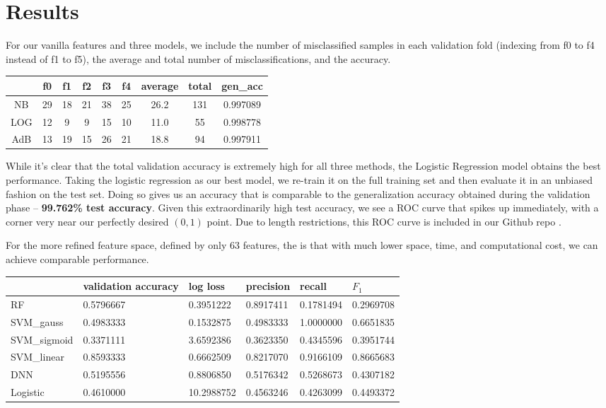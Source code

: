 \documentclass{article} %
\begin{document}
\section{Results}
For our vanilla features and three models, we include the number of misclassified samples in each validation fold (indexing from f0 to f4 instead of f1 to f5), the average and total number of misclassifications, and the accuracy.
\begin{table}[h]
\centering
\small
\begin{tabular}{|c|c|c|c|c|c|c|c|c|}
\hline
    & f0 & f1 & f2 & f3 & f4 & average & total & gen\_acc \\ \hline
NB  & 29 & 18 & 21 & 38 & 25 & 26.2    & 131   & 0.997089 \\ \hline
LOG & 12 & 9  & 9  & 15 & 10 & 11.0    & 55    & 0.998778 \\ \hline
AdB & 13 & 19 & 15 & 26 & 21 & 18.8    & 94    & 0.997911 \\ \hline
\end{tabular}
\end{table}
While it's clear that the total validation accuracy is extremely high for all three methods, the Logistic Regression model obtains the best performance.  Taking the logistic regression as our best model, we re-train it on the full training set and then evaluate it in an unbiased fashion on the test set.  Doing so gives us an accuracy that is comparable to the generalization accuracy obtained during the validation phase -- \textbf{99.762\% test accuracy}.  Given this extraordinarily high test accuracy, we see a ROC curve that spikes up immediately, with a corner very near our perfectly desired $(0, 1)$ point. \cite{ggplot2}  Due to length restrictions, this ROC curve is included in our Github repo \cite{gh}.\par 
For the more refined feature space, defined by only 63 features, the is that with much lower space, time, and computational cost, we can achieve comparable performance.
\begin{table}[H]
\small
\centering
\begin{tabular}{|l|l|l|l|l|l|}
\hline
             & validation accuracy & log loss   & precision & recall    & $F_1$     \\ \hline
RF           & 0.5796667           & 0.3951222  & 0.8917411 & 0.1781494 & 0.2969708 \\ \hline
SVM\_gauss   & 0.4983333           & 0.1532875  & 0.4983333 & 1.0000000 & 0.6651835 \\ \hline
SVM\_sigmoid & 0.3371111           & 3.6592386  & 0.3623350 & 0.4345596 & 0.3951744 \\ \hline
SVM\_linear  & 0.8593333           & 0.6662509  & 0.8217070 & 0.9166109 & 0.8665683 \\ \hline
DNN          & 0.5195556           & 0.8806850  & 0.5176342 & 0.5268673 & 0.4307182 \\ \hline
Logistic     & 0.4610000           & 10.2988752 & 0.4563246 & 0.4263099 & 0.4493372 \\ \hline
\end{tabular}
\end{table}
\end{document}
